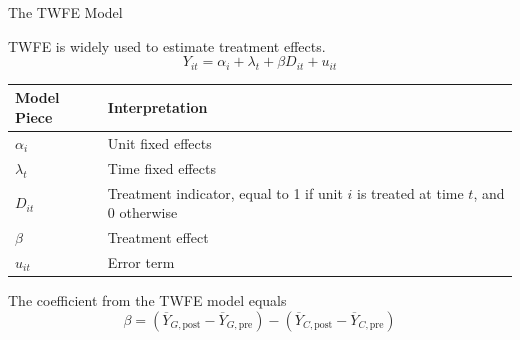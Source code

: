 \documentclass[aspectratio=169,11pt]{beamer}
\newcommand{\accentline}{\vspace{0.15em}{\color{UFOrange}\rule{\textwidth}{1.2pt}}\vspace{0.25em}}
\begin{document}
\begin{frame}{The TWFE Model}
\setlength{\abovedisplayskip}{3pt}
\setlength{\belowdisplayskip}{2pt}
\accentline
\par
TWFE is widely used to estimate treatment effects.
\[
Y_{it}
=
\alpha_i
+ \lambda_t
+ \beta D_{it}
+ u_{it}
\]
\begin{center}
\small
\begin{tabular}{L{0.22\textwidth}L{0.58\textwidth}}
\toprule
\textbf{Model Piece} & \textbf{Interpretation} \\
\midrule
$\alpha_i$ & Unit fixed effects \\
$\lambda_t$ & Time fixed effects \\
$D_{it}$ & Treatment indicator, equal to 1 if unit $i$ is treated at time $t$, and 0 otherwise \\
$\beta$ & Treatment effect \\
$u_{it}$ & Error term \\
\bottomrule
\end{tabular}
\end{center}
The coefficient from the TWFE model equals
\[
\beta
= \left(\overline Y_{G,\mathrm{post}}-\overline Y_{G,\mathrm{pre}}\right)
- \left(\overline Y_{C,\mathrm{post}}-\overline Y_{C,\mathrm{pre}}\right)
\]
\end{frame}
\end{document}
